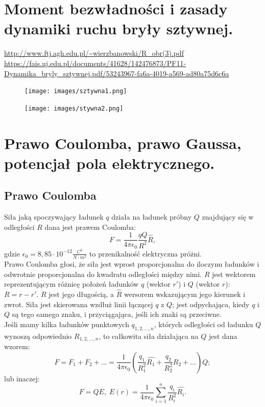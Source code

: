 \documentclass{article}
\begin{document}
\section{Moment bezwładności i zasady dynamiki ruchu bryły sztywnej.}
\url{http://www.ftj.agh.edu.pl/~wierzbanowski/R_obr(3).pdf}\\
\url{https://fais.uj.edu.pl/documents/41628/142476873/PF11-Dynamika_bryly_sztywnej.pdf/53243967-fa6a-4019-a569-ad80a75d6c6a}
\begin{figure}[H]
    \centering
\texttt{[image: images/sztywna1.png]}
\end{figure}
\begin{figure}[H]
    \centering
\texttt{[image: images/stywna2.png]}
\end{figure}


\section{Prawo Coulomba, prawo Gaussa, potencjał pola elektrycznego.}
\subsection{Prawo Coulomba}
Siła jaką spoczywający ładunek $q$ działa na ładunek próbny $Q$ znajdujący się w odległości $R$ dana jest prawem Coulomba:
\begin{equation*}
    F = \frac{1}{4\pi \epsilon_0}\frac{qQ}{R^2}\hat{R},
\end{equation*}
gdzie $\epsilon_0=8,85\cdot 10^{-12}\frac{C^2}{N\cdot m^2}$ to przenikalność elektryczna próżni. \\
Prawo Coulomba głosi, że siła jest wprost proporcjonalna do iloczynu ładunków i odwrotnie proporcjonalna do kwadratu odległości między nimi. $R$ jest wektorem reprezentującym różnicę położeń ładunków $q$ (wektor $r'$) i $Q$ (wektor $r$): $R=r-r'$. $R$ jest jego długością, a $\hat{R}$ wersorem wskazującym jego kierunek i zwrot. Siła jest skierowana wzdłuż linii łączącej $q$ z $Q$; jest odpychająca, kiedy $q$ i $Q$ są tego samego znaku, i przyciągająca, jeśli ich znaki są przeciwne. \\

Jeśli mamy kilka ładunków punktowych $q_{1,2,...,n}$, których odległości od ładunku $Q$ wynoszą odpowiednio $R_{1,2,...,n}$, to całkowita siła działająca na $Q$ jest dana wzorem:
\begin{equation*}
    F=F_1+F_2+...=\frac{1}{4\pi\epsilon_0}\left( \frac{q_1}{R_1^2}\hat{R_1}+\frac{q_2}{R_2^2}\hat{R_2}+... \right)Q;
\end{equation*}
lub inaczej:
\begin{equation*}
    F=QE, \; E(r) = \frac{1}{4\pi\epsilon_0} \sum_{i=1}^{n} \frac{q_i}{R_i^2}\hat{R_i}.  
\end{equation*}
\end{document}
